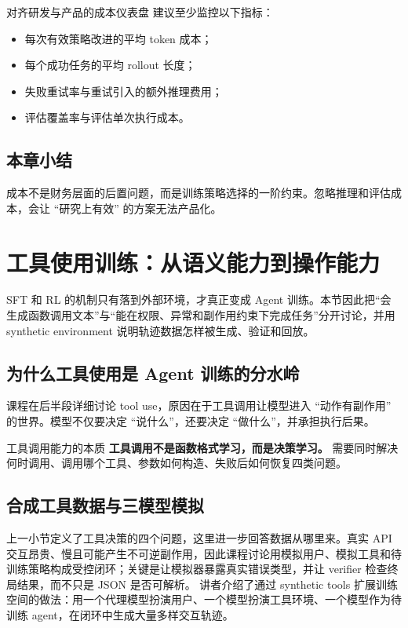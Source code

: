 \documentclass[a4paper]{article}
\begin{document}
\begin{knowledgebox}{对齐研发与产品的成本仪表盘}
建议至少监控以下指标：
\begin{itemize}
    \item 每次有效策略改进的平均 token 成本；
    \item 每个成功任务的平均 rollout 长度；
    \item 失败重试率与重试引入的额外推理费用；
    \item 评估覆盖率与评估单次执行成本。
\end{itemize}
\end{knowledgebox}

\subsection{本章小结}
成本不是财务层面的后置问题，而是训练策略选择的一阶约束。忽略推理和评估成本，会让 ``研究上有效'' 的方案无法产品化。


\section{工具使用训练：从语义能力到操作能力}

SFT 和 RL 的机制只有落到外部环境，才真正变成 Agent 训练。本节因此把“会生成函数调用文本”与“能在权限、异常和副作用约束下完成任务”分开讨论，并用 synthetic environment 说明轨迹数据怎样被生成、验证和回放。

\subsection{为什么工具使用是 Agent 训练的分水岭}
课程在后半段详细讨论 tool use，原因在于工具调用让模型进入 ``动作有副作用'' 的世界。模型不仅要决定 ``说什么''，还要决定 ``做什么''，并承担执行后果。

\begin{importantbox}{工具调用能力的本质}
\textbf{工具调用不是函数格式学习，而是决策学习。} 需要同时解决何时调用、调用哪个工具、参数如何构造、失败后如何恢复四类问题。
\end{importantbox}

\subsection{合成工具数据与三模型模拟}
上一小节定义了工具决策的四个问题，这里进一步回答数据从哪里来。真实 API 交互昂贵、慢且可能产生不可逆副作用，因此课程讨论用模拟用户、模拟工具和待训练策略构成受控闭环；关键是让模拟器暴露真实错误类型，并让 verifier 检查终局结果，而不只是 JSON 是否可解析。
讲者介绍了通过 synthetic tools 扩展训练空间的做法：用一个代理模型扮演用户、一个模型扮演工具环境、一个模型作为待训练 agent，在闭环中生成大量多样交互轨迹。
\end{document}
